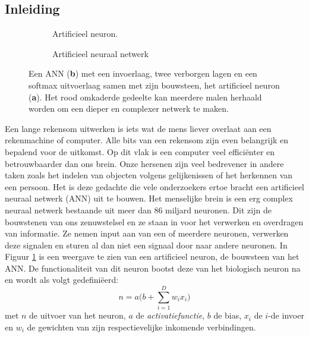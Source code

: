 \subsection{Inleiding}
\begin{figure}
	\centering
	\begin{subfigure}{.5\textwidth}
		\centering
		
		\caption{Artificieel neuron.}
		\label{fig:neuron}
	\end{subfigure}%
	\begin{subfigure}{.5\textwidth}
		\centering
		
		\caption{Artificieel neuraal netwerk}
		\label{fig:ANN}
	\end{subfigure}
	\caption{Een ANN (\textbf{b}) met een invoerlaag, twee verborgen lagen en een softmax uitvoerlaag samen met zijn bouwsteen, het artificieel neuron (\textbf{a}). Het rood omkaderde gedeelte kan meerdere malen herhaald worden om een dieper en complexer netwerk te maken.}
	\label{fig:test}
\end{figure}
Een lange rekensom uitwerken is iets wat de mens liever overlaat aan een rekenmachine of computer. Alle bits van een rekensom zijn even belangrijk en bepalend voor de uitkomst. Op dit vlak is een computer veel effici\"enter en betrouwbaarder dan ons brein. Onze hersenen zijn veel bedrevener in andere taken zoals het indelen van objecten volgens gelijkenissen of het herkennen van een persoon.
\npar Het is deze gedachte die vele onderzoekers ertoe bracht een artificieel neuraal netwerk (ANN) uit te bouwen. Het menselijke brein is een erg complex neuraal netwerk bestaande uit meer dan 86 miljard neuronen. Dit zijn de bouwstenen van ons zenuwstelsel en ze staan in voor het verwerken en overdragen van informatie. Ze nemen input aan van een of meerdere neuronen, verwerken deze signalen en sturen al dan niet een signaal door naar  andere neuronen. In Figuur \ref{fig:neuron} is een weergave te zien van een artificieel neuron, de bouwsteen van het ANN. De functionaliteit van dit neuron bootst deze van het biologisch neuron na en wordt als volgt gedefini\"eerd:
\begin{equation}\label{eq:neuron}
n = a\bigg(b+\sum_{i=1}^{D}w_ix_i\bigg)
\end{equation}
met $n$ de uitvoer van het neuron, $a$ de \textit{activatiefunctie}, $b$ de bias, $x_i$ de $i$-de invoer en $w_i$ de gewichten van zijn respectievelijke inkomende verbindingen.



